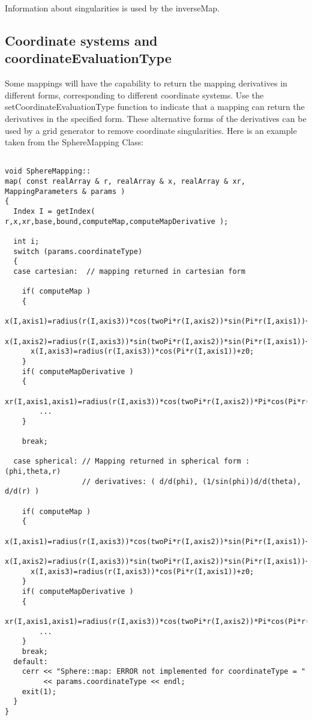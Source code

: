 \documentclass[xcolor=rgb,svgnames,dvipsnames]{article}
\newcommand{\Index}[1]{#1\index{#1}}
\begin{document}
Information about singularities is used by the {\ff inverseMap}.

\subsection{Coordinate systems and coordinateEvaluationType }

Some mappings will have the capability to return
the mapping derivatives in different forms, corresponding to different
\Index{coordinate systems}. Use the {\ff setCoordinateEvaluationType} function to 
indicate that a mapping can return the derivatives in the specified form.
These alternative forms of the derivatives can
be used by a grid generator to remove coordinate singularities.
Here is an example taken from the {\ff SphereMapping} Class:

{\footnotesize
\begin{verbatim}

void SphereMapping::
map( const realArray & r, realArray & x, realArray & xr, MappingParameters & params )
{
  Index I = getIndex( r,x,xr,base,bound,computeMap,computeMapDerivative );

  int i;
  switch (params.coordinateType)
  {
  case cartesian:  // mapping returned in cartesian form

    if( computeMap )
    {
      x(I,axis1)=radius(r(I,axis3))*cos(twoPi*r(I,axis2))*sin(Pi*r(I,axis1))+x0; 
      x(I,axis2)=radius(r(I,axis3))*sin(twoPi*r(I,axis2))*sin(Pi*r(I,axis1))+y0;
      x(I,axis3)=radius(r(I,axis3))*cos(Pi*r(I,axis1))+z0;
    }
    if( computeMapDerivative )
    {
      xr(I,axis1,axis1)=radius(r(I,axis3))*cos(twoPi*r(I,axis2))*Pi*cos(Pi*r(I,axis1)); 
        ...
    }
    
    break;

  case spherical: // Mapping returned in spherical form : (phi,theta,r) 
                  // derivatives: ( d/d(phi), (1/sin(phi))d/d(theta), d/d(r) )

    if( computeMap )
    {
      x(I,axis1)=radius(r(I,axis3))*cos(twoPi*r(I,axis2))*sin(Pi*r(I,axis1))+x0; 
      x(I,axis2)=radius(r(I,axis3))*sin(twoPi*r(I,axis2))*sin(Pi*r(I,axis1))+y0;
      x(I,axis3)=radius(r(I,axis3))*cos(Pi*r(I,axis1))+z0;
    }
    if( computeMapDerivative )
    {
      xr(I,axis1,axis1)=radius(r(I,axis3))*cos(twoPi*r(I,axis2))*Pi*cos(Pi*r(I,axis1)); 
        ...
    }
    break;
  default:
    cerr << "Sphere::map: ERROR not implemented for coordinateType = " 
         << params.coordinateType << endl;
    exit(1);
  }
}
\end{verbatim}
}
\end{document}
